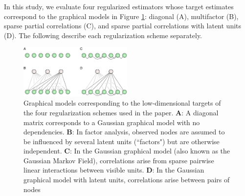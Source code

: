 In this study, we evaluate four regularized estimators whose target estimates correspond to the graphical models in Figure \ref{fig:02}: diagonal (A), multifactor (B), sparse partial correlations (C), and sparse  partial correlations with latent units (D).  The following describe each regularization scheme separately.

\begin{figure}[htp]
\centering
\includegraphics[width=0.5\textwidth]{figures/Figure2.pdf}
\caption{
Graphical models corresponding to the low-dimensional targets of the four regularization schemes used in the paper.
\textbf{A}: A diagonal matrix corresponds to a Gaussian graphical model with no dependencies. 
\textbf{B}: In factor analysis, observed nodes are assumed to be influenced by several latent units (``factors") but are otherwise independent. 
\textbf{C}: In the Gaussian graphical model (also known as the Gaussian Markov Field), correlations arise from sparse pairwise linear interactions between visible units. 
\textbf{D}: In the Gaussian graphical model with latent units, correlations arise  between pairs of nodes 
}\label{fig:02}
\end{figure}

